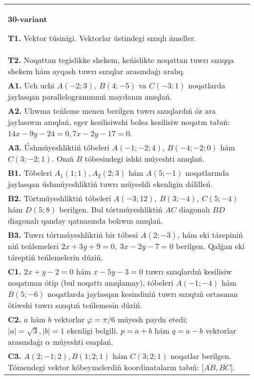 \documentclass{article}
\begin{document}
\begin{tabular}{m{17cm}}
\textbf{30-variant}

\textbf{T1.} 
Vektor túsinigi. Vektorlar ústindegi sızıqlı ámeller.
 \\
\textbf{T2.} 
Noqattan tegislikke shekem, keńislikte noqattan tuwrı sızıqqa shekem hám ayqash tuwrı sızıqlar arasındaǵı aralıq.
 \\
\textbf{A1.} 
Uch uchi $A (-2;3), \ B (4;-5) $ va
$C (-3;1)$ noqatlarda jaylasqan parallelogrammnıń maydanın anıqlań.
 \\
\textbf{A2.} 
Ulıwma teńleme menen berilgen tuwrı sızıqlardıń
óz ara jaylasıwın anıqlań, eger kesilisiwshi bolsa kesilisiw noqatın
tabıń: $14x-9y-24=0, 7x-2y-17=0$.
 \\
\textbf{A3.} 
Úshmúyeshliktiń tóbeleri
$A (- 1; - 2;4) $, $B (- 4; - 2;0) $ hám $C (3; -2;1) $. Onıń $B$ tóbesindegi
ishki múyeshti anıqlań.
 \\
\textbf{B1.} 
Tóbeleri $A_1 (1; 1), A_2 (2; 3) $ hám $A (5;-1) $
noqatlarında jaylasqan úshmúyeshliktiń tuwrı múyeshli ekenligin dálilleń.
 \\
\textbf{B2.} 
Tórtmúyeshliktiń tóbeleri
\(A (-3;12),\ B (3;-4),\ C (5;-4) \) hám \(D (5;8) \) berilgen. Bul
tórtmúyeshliktiń $AC$ diagonalı $BD$ diagonalı qanday
qatnasında bolıwın anıqlań.
 \\
\textbf{B3.} 
Tuwrı tórtmúyeshliktiń bir tóbesi \(A (2;-3) \), hám eki tárepiniń
niń teńlemeleri \(2x+3y+9=0,\ 3x-2y-7=0\)
berilgen. Qalǵan eki táreptiń teńlemelerin dúziń.
 \\
\textbf{C1.} 
\(2x+y-2=0\) hám \(x-5y-3=0\)
tuwrı sızıqlardıń kesilisiw noqatınan ótip (bul noqattı anıqlamay), tóbeleri
\(A (-1;-4) \) hám \(B (5;-6) \) noqatlarda jaylasqan kesindiniń
tuwrı sızıqtıń ortasınan ótiwshi tuwrı sızıqtıń teńlemesin dúziń.
 \\
\textbf{C2.} 
$a$ hám $b$ vektorlar $\varphi = \pi/6$ múyesh payda etedi; $|a| = \sqrt{3},|b| = 1$ ekenligi belgili. $p = a + b$ hám $q = a - b$ vektorlar arasındaǵı $\alpha$ múyeshti esaplań.
 \\
\textbf{C3.} 
$A (2; -1;2), B (1;2; 1) $ hám $C (3;2;1) $ noqatlar berilgen. Tómendegi vektor kóbeymelerdiń koordinataların tabıń:
$\lbrack\overline{AB},\overline{BC}\rbrack$.
 \\

\end{tabular}
\vspace{1cm}
\end{document}
